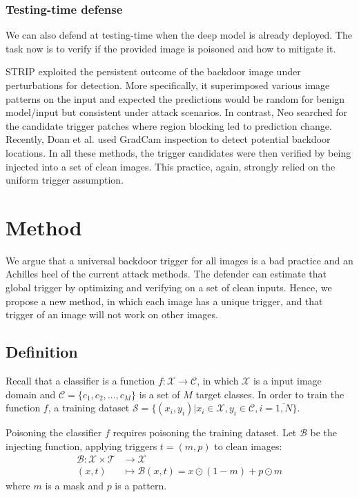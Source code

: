 \subsubsection{Testing-time defense} We can also defend at testing-time when the deep model is already deployed. The task now is to verify if the provided image is poisoned and how to mitigate it.

STRIP \cite{gao2019strip} exploited the persistent outcome of the backdoor image under perturbations for detection. More specifically, it superimposed various image patterns on the input and expected the predictions would be random for benign model/input but consistent under attack scenarios. In contrast, Neo \cite{udeshi2019model} searched for the candidate trigger patches where region blocking led to prediction change. Recently, Doan et al. \cite{Doan2019Aug} used GradCam inspection to detect potential backdoor locations. In all these methods, the trigger candidates were then verified by being injected into a set of clean images. This practice, again, strongly relied on the uniform trigger assumption.

\section{Method}
We argue that a universal backdoor trigger for all images is a bad practice and an Achilles heel of the current attack methods. The defender can estimate that global trigger by optimizing and verifying on a set of clean inputs. Hence, we propose a new method, in which each image has a unique trigger, and that trigger of an image will not work on other images.
\subsection{Definition}
    Recall that a classifier is a function $f: \mathcal{X} \rightarrow \mathcal{C}$, in which $\mathcal{X}$ is a input image domain and $\mathcal{C}=\{c_1, c_2, \dots, c_M\}$ is a set of $M$ target classes. In order to train the function $f$, a training dataset $\mathcal{S}=\{(x_i, y_i)|x_i \in \mathcal{X}, y_i\in\mathcal{C}, i=\overline{1,N}\}$.  
    
    Poisoning the classifier $f$ requires poisoning the training dataset. Let $\mathcal{B}$ be the injecting function, applying triggers $t=(m, p)$ to clean images:
    \begin{align*}
       \mathcal{B}: \mathcal{X}\times\mathcal{T}&\longrightarrow\mathcal{X}\\
    (x, t) &\longmapsto \mathcal{B}(x, t) = x \odot (1-m) + p \odot m 
    \end{align*}
    where $m$ is a mask and $p$ is a pattern. 
    
